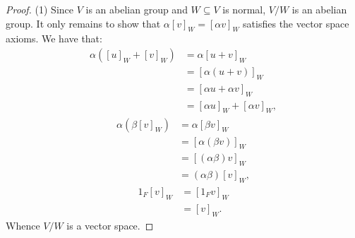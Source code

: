 \documentclass[11pt,twoside,openany]{memoir}
\begin{document}
        \begin{proof}
            (1) Since $V$ is an abelian group and $W \subseteq V$ is normal, $V/W$ is an abelian group. It only remains to show that $\alpha[v]_W = [\alpha v]_W$ satisfies the vector space axioms. We have that:
                \begin{equation*}
                \begin{split}
                    \alpha \left( [u]_W + [v]_W \right)
                    & = \alpha [u+v]_W \\
                    & = [\alpha (u+v)]_W \\
                    & = [\alpha u + \alpha v]_W \\
                    & = [\alpha u]_W + [\alpha  v]_W,
                \end{split}
                \end{equation*}
                \begin{equation*}
                \begin{split}
                    \alpha \left( \beta [v]_W \right)
                    & = \alpha [\beta v]_W \\
                    & = [\alpha (\beta v)]_W \\
                    & = [(\alpha \beta)v]_W \\
                    & = (\alpha \beta)[v]_W,
                \end{split}
                \end{equation*}
                \begin{equation*}
                \begin{split}
                    1_F [v]_W 
                    & = [1_F v]_W \\
                    & = [v]_W.
                \end{split}
                \end{equation*}
            Whence $V/W$ is a vector space.


\end{proof}
\end{document}
